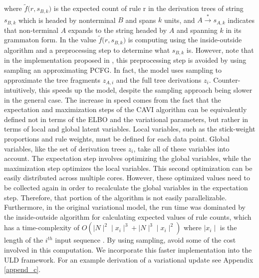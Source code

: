\documentclass[12pt,letterpaper]{article}
\begin{document}
where $\tilde f \Big(r, s_{B,k}\Big)$ is the expected count of rule r in the derivation trees of string $s_{B,k}$ which is headed by nonterminal $B$ and spans $k$ units, and $A \overset{*}{\rightarrow} s_{A,k}$ indicates that non-terminal $A$ expands to the string headed by $A$ and spanning $k$ in its grammaton form. In \citet{cohen:2010} the value $\tilde f \Big(r, s_{B,k}\Big)$ is computing using the inside-outside algorithm and a preprocessing step to determine what $s_{B,k}$ is. However, note that in the implementation proposed in \citet{zhai:2014}, this preprocessing step is avoided by using sampling an approximating PCFG. In fact, the \citet{zhai:2014} model uses sampling to approximate the tree fragments $z_{A,i}$ and the full tree derivations $z_i$. Counter-intuitively, this speeds up the model, despite the sampling approach being slower in the general case. The increase in speed comes from the fact that the expectation and maximization steps of the CAVI algorithm can be equivalently defined not in terms of the ELBO and the variational parameters, but rather in terms of local and global latent variables. Local variables, such as the stick-weight proportions and rule weights, must be defined for each data point. Global variables, like the set of derivation trees $z_i$, take all of these variables into account. The expectation step involves optimizing the global variables, while the maximization step optimizes the local variables. This second optimization can be easily distributed across multiple cores. However, these optimized values need to be collected again in order to recalculate the global variables in the expectation step. Therefore, that portion of the algorithm is not easily parallelizable. Furthermore, in the original variational model, the run time was dominated by the inside-outside algorithm for calculating expected values of rule counts, which has a time-complexity of $O(\mid N \mid^2 \mid x_i \mid^3 + \mid N \mid^3\mid x_i\mid^2)$ where $\mid x_i \mid$ is the length of the $i^{th}$ input sequence \citep{cohen:2010}. By using sampling, \citet{zhai:2014} avoid some of the cost involved in this computation. We incorporate this faster implementation into the ULD framework. For an example derivation of a variational update see Appendix \ref{append_c}. 
\end{document}
